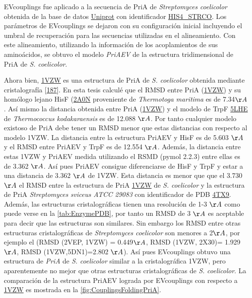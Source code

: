 \documentclass[12pt,twoside]{reedthesis}
\begin{document}
  EVcouplings fue aplicado a la secuencia de PriA de \emph{Streptomyces
  coelicolor} obtenida de la base de datos
  \href{https://www.uniprot.org/}{Uniprot} con identificador
  \href{https://www.uniprot.org/uniprot/P16250}{HIS4\_STRCO}. Los
  parámetros de EVcouplings se dejaron con su configuración inicial
  incluyendo el umbral de recuperación para las secuencias utilizadas en
  el alineamiento. Con este alineamiento, utilizando la información de los
  acoplamientos de sus aminoácidos, se obtuvo el modelo \emph{PriAEV} de
  la estructura tridimensional de PriA de \emph{S. coelicolor}.
  
  Ahora bien, \href{https://www.rcsb.org/structure/1vzw}{1VZW} es una
  estructura de PriA de \emph{S. coelicolor} obtenida mediante
  cristalografía {[}\protect\hyperlink{ref-kuper_twofold_2005}{187}{]}. En
  esta tesis calculé que el RMSD entre PriA
  (\href{https://www.rcsb.org/structure/1vzw}{1VZW}) y su homólogo lejano
  HisF (\href{http://www.rcsb.org/structure/2A0N}{2A0N} proveniente de
  \emph{Thermotoga maritima} es de 7.34\({\AA}\). Así mismo la distancia
  obtenida entre PriA (\href{https://www.rcsb.org/structure/1vzw}{1VZW}) y
  el modelo de TrpF \href{http://www.rcsb.org/structure/5LHE}{5LHE} de
  \emph{Thermococcus kodakaraensis} es de 12.088 \({\AA}\). Por tanto
  cualquier modelo existoso de PriA debe tener un RMSD menor que estas
  distancias con respecto al modelo 1VZW. La distancia entre la estructura
  PriAEV y HisF es de 5.603 \({\AA}\) y el RMSD entre PriAEV y TrpF es de
  12.554 \({\AA}\). Además, la distancia entre estas 1VZW y PriAEV medida
  utilizando el RSMD (pymol 2.2.3) entre ellas es de 3.362 \({\AA}\). Así
  pues PriAEV consigue diferenciarse de HisF y TrpF y estar a una
  distancia de 3.362 \({\AA}\) de 1VZW. Esta distancia es menor que que el
  3.730 \({\AA}\) el RMSD entre la estructura de PriA
  \href{https://www.rcsb.org/structure/1vzw}{1VZW} de \emph{S. coelicolor}
  y la estructura de PriA \emph{Streptomyces sviceus ATCC 29083} con
  identificador de PDB \href{https://www.rcsb.org/structure/4TX9}{4TX9}.
  Además, las estructuras cristalográficas tienen una resolución de 1-3
  \({\AA}\) como puede verse en la \autoref{tab:EnzymePDB}, por tanto un
  RMSD de 3 \({\AA}\) es aceptable para decir que las estructuras son
  similares. Sin embargo los RMSD entre otras estructuras cristalográficas
  de \emph{Streptomyces coelicolor} son menores a 2\({\AA}\), por ejemplo
  el (RMSD (2VEP, 1VZW) = 0.449\({\AA}\), RMSD (1VZW, 2X30)= 1.929
  \({\AA}\), RMSD (1VZW,5DN1)=2.802 \({\AA}\)). Así pues EVcouplings
  obtuvo una estructura de \emph{PriA} de \emph{S. coelicolor} similar a
  la cristalográfica 1VZW, pero aparentemente no mejor que otras
  estructuras cristalográficas de \emph{S. coelicolor}. La comparación de
  la estructura PriAEV lograda por EVcouplings con respecto a
  \href{https://www.rcsb.org/structure/1vzw}{1VZW} es mostrada en la
  \autoref{fig:CouplingsFoldingPriA}.
  
\end{document}

